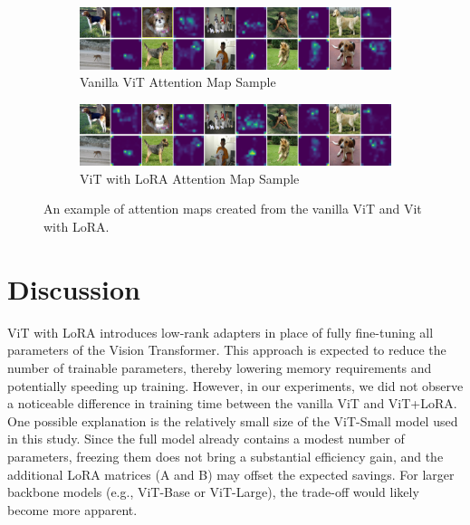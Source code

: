\documentclass[10pt]{article}
\begin{document}
\begin{figure}[htbp]
    \centering
    \begin{subfigure}[b]{1\textwidth}
        \centering
        \includegraphics[width=\textwidth]{images/grid_attention_vit.png} %
        \caption{Vanilla ViT Attention Map Sample}
        \label{fig:vit_attentionmap}
    \end{subfigure}

    \vspace{0.5cm} %

    \begin{subfigure}[b]{1\textwidth}
        \centering
        \includegraphics[width=\textwidth]{images/grid_attention_lora.png} %
        \caption{ViT with LoRA Attention Map Sample}
        \label{fig:lora_attentionmap}
    \end{subfigure}

    \caption{An example of attention maps created from the vanilla ViT and Vit with LoRA.}
    \label{fig:attentionmaps}
\end{figure}

\section{Discussion}
ViT with LoRA introduces low-rank adapters in place of fully fine-tuning all parameters of the Vision Transformer. This approach is expected to reduce the number of trainable parameters, thereby lowering memory requirements and potentially speeding up training. However, in our experiments, we did not observe a noticeable difference in training time between the vanilla ViT and ViT+LoRA. One possible explanation is the relatively small size of the ViT-Small model used in this study. Since the full model already contains a modest number of parameters, freezing them does not bring a substantial efficiency gain, and the additional LoRA matrices (A and B) may offset the expected savings. For larger backbone models (e.g., ViT-Base or ViT-Large), the trade-off would likely become more apparent.
\end{document}
